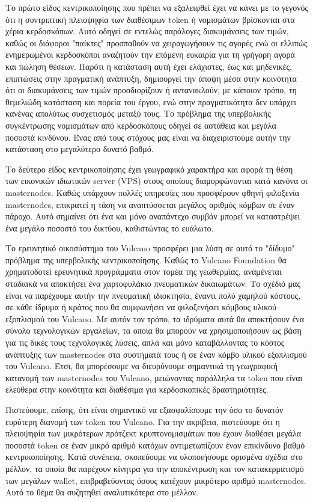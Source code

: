 \documentclass[A4paper, 12pt]{article}
\begin{document}
Το πρώτο είδος κεντρικοποίησης που πρέπει να εξαλειφθεί έχει να κάνει με το γεγονός ότι η συντριπτική πλειοψηφία των διαθέσιμων token ή νομισμάτων βρίσκονται στα χέρια κερδοσκόπων. Αυτό οδηγεί σε εντελώς παράλογες διακυμάνσεις των τιμών, καθώς οι διάφοροι "παίκτες" προσπαθούν να χειραγωγήσουν τις αγορές ενώ οι ελλιπώς ενημερωμένοι κερδοσκόποι αναζητούν την επόμενη ευκαιρία για τη γρήγορη αγορά και πώληση θέσεων. Παρότι η κατάσταση αυτή έχει ελάχιστες, έως και μηδενικές, επιπτώσεις στην πραγματική ανάπτυξη, δημιουργεί την άποψη μέσα στην κοινότητα ότι οι διακυμάνσεις των τιμών προσδιορίζουν ή αντανακλούν, με κάποιον τρόπο, τη θεμελιώδη κατάσταση και πορεία του έργου, ενώ στην πραγματικότητα δεν υπάρχει κανένας απολύτως συσχετισμός μεταξύ τους. Το πρόβλημα της υπερβολικής συγκέντρωσης νομισμάτων από κερδοσκόπους οδηγεί σε αστάθεια και μεγάλα ποσοστά κινδύνου. Ένας από τους στόχους μας είναι να διαχειριστούμε αυτήν την κατάσταση στο μεγαλύτερο δυνατό βαθμό.

Το δεύτερο είδος κεντρικοποίησης έχει γεωγραφικό χαρακτήρα και αφορά τη θέση των εικονικών ιδιωτικών server (VPS) στους οποίους διαμορφώνονται κατά κανόνα οι masternodes. Καθώς υπάρχουν πολλές υπηρεσίες που προσφέρουν φθηνή φιλοξενία masternodes, επικρατεί η τάση να αναπτύσσεται μεγάλος αριθμός κόμβων σε έναν πάροχο. Αυτό σημαίνει ότι ένα και μόνο αναπάντεχο συμβάν μπορεί να καταστρέψει ένα μεγάλο ποσοστό του δικτύου, καθιστώντας το ευάλωτο.

Το ερευνητικό οικοσύστημα του Vulcano προσφέρει μια λύση σε αυτό το "δίδυμο" πρόβλημα της υπερβολικής κεντρικοποίησης. Καθώς το Vulcano Foundation θα χρηματοδοτεί ερευνητικά προγράμματα στον τομέα της γεωθερμίας, αναμένεται σταδιακά να αποκτήσει ένα χαρτοφυλάκιο πνευματικών δικαιωμάτων. Το σχέδιό μας είναι να παρέχουμε αυτήν την πνευματική ιδιοκτησία, έναντι πολύ χαμηλού κόστους, σε κάθε ίδρυμα ή κράτος που θα συμφωνήσει να φιλοξενήσει κόμβους υλικού εξοπλισμού του Vulcano. Με αυτόν τον τρόπο, τα ιδρύματα αυτά θα αποκτήσουν ένα σύνολο τεχνολογικών εργαλείων, τα οποία θα μπορούν να χρησιμοποιήσουν ως βάση για τις δικές τους τεχνολογικές λύσεις, απλά και μόνο καταβάλλοντας το κόστος ανάπτυξης των masternodes στα συστήματά τους ή σε έναν κόμβο υλικού εξοπλισμού του Vulcano. Έτσι, θα μπορέσουμε να διευρύνουμε σημαντικά τη γεωγραφική κατανομή των masternodes του Vulcano, μειώνοντας παράλληλα τα token που είναι ελεύθερα στην κοινότητα και διαθέσιμα για κερδοσκοπικές δραστηριότητες.

Πιστεύουμε, επίσης, ότι είναι σημαντικό να εξασφαλίσουμε την όσο το δυνατόν ευρύτερη διανομή των token του Vulcano. Για την ακρίβεια, πιστεύουμε ότι η πλειοψηφία των μικρότερων πρότζεκτ κρυπτονομισμάτων που έχουν διαθέσει μεγάλα ποσοστά token σε έναν μικρό αριθμό κατόχων αντιμετωπίζουν έναν επικίνδυνο βαθμό κεντρικοποίησης. Κατά συνέπεια, σκοπεύουμε να υλοποιήσουμε ορισμένα σχέδια στο μέλλον, τα οποία θα παρέχουν κίνητρα για την αποκέντρωση και τον κατακερματισμό των μεγάλων wallet, επιβραβεύοντας όσους κατέχουν μικρότερο αριθμό masternodes. Αυτό το θέμα θα συζητηθεί αναλυτικότερα στο μέλλον.
\end{document}
